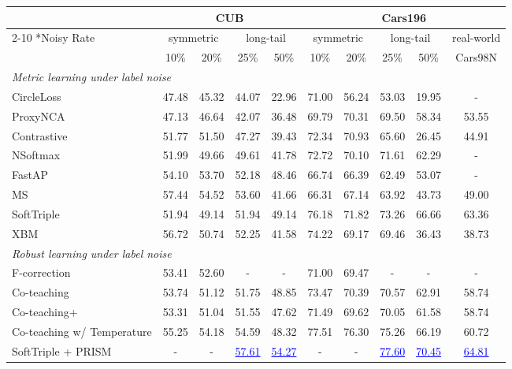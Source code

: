 \documentclass[10pt,twocolumn,letterpaper]{article}
\begin{document}
\begin{table*}[ht]
\centering
\begin{tabular}{l|cccc|ccccc}
\hline
    &\multicolumn{4}{c|}{CUB \cite{cub}}&\multicolumn{5}{c}{Cars196 \cite{cars}}\\\cline{2-10}
    \multirow{2}*{Noisy Rate}&\multicolumn{2}{c}{symmetric}&\multicolumn{2}{c|}{long-tail}&\multicolumn{2}{c}{symmetric}&\multicolumn{2}{c}{long-tail}&real-world\\
    &10\%&20\%&25\%&50\%&10\%&20\%&25\%&50\%&Cars98N \cite{prism}\\
\hline
    \multicolumn{10}{l}{\textit{Metric learning under label noise}}\\ \hline
    CircleLoss \cite{circleloss}&47.48&45.32&44.07&22.96&71.00&56.24&53.03&19.95&-\\
    ProxyNCA \cite{proxynca}&47.13&46.64&42.07&36.48&69.79&70.31&69.50&58.34&53.55\\
    Contrastive \cite{contrast} &51.77&51.50&47.27&39.43&72.34&70.93&65.60&26.45&44.91\\
    NSoftmax \cite{nsoftmax}&51.99&49.66&49.61&41.78&72.72&70.10&71.61&62.29&-\\
    FastAP \cite{fastap}&54.10&53.70&52.18&48.46&66.74&66.39&62.49&53.07&-\\
    MS \cite{ms} &57.44&54.52&53.60&41.66&66.31&67.14&63.92&43.73&49.00\\
    SoftTriple \cite{softtriple}&51.94&49.14&51.94&49.14&76.18&71.82&73.26&66.66&63.36\\
    XBM \cite{xbm}&56.72&50.74&52.25&41.58&74.22&69.17&69.46&36.43&38.73\\
\hline
    \multicolumn{10}{l}{\textit{Robust learning under label noise}}\\ \hline
    F-correction \cite{fcorrection} &53.41&52.60&-&-&71.00&69.47&-&-&-\\
    Co-teaching \cite{coteaching}&53.74&51.12&51.75&48.85&73.47&70.39&70.57&62.91&58.74\\
    Co-teaching+ \cite{coteaching_plus}&53.31&51.04&51.55&47.62&71.49&69.62&70.05&61.58&58.74\\
    Co-teaching w/ Temperature \cite{nsoftmax} &55.25&54.18&54.59&48.32&77.51&76.30&75.26&66.19&60.72\\
    SoftTriple + PRISM \cite{prism} &-&-&\textcolor{blue}{\underline{57.61}}&\textcolor{blue}{\underline{54.27}}&-&-&\textcolor{blue}{\underline{77.60}}&\textcolor{blue}{\underline{70.45}}&\textcolor{blue}{\underline{64.81}}\\

\end{tabular}
\end{table*}
\end{document}
